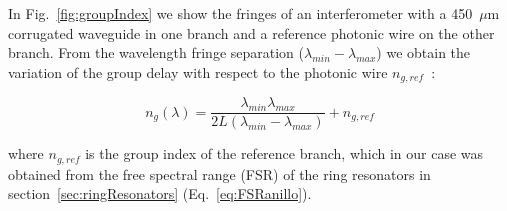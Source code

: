 \documentclass[journal]{IEEEtran}
\begin{document}




In Fig.~\ref{fig:groupIndex} we show the fringes of an interferometer with a 450~$\mu$m corrugated waveguide in one branch and a reference photonic wire on the other branch. From the wavelength fringe separation ($ \lambda_{min} - \lambda_{max} $) we obtain the variation of the group delay with respect to the photonic wire $ n_{g,ref} $~\cite{vlasov:05}:



\begin{equation}
  n_g (\lambda)=\frac{\lambda_{min} \lambda_{max}}{ 2L (\lambda_{min} - \lambda_{max})} + n_{g,ref}
\end{equation}


where $n_{g,ref}$ is the group index of the reference branch, which in our case was obtained from the free spectral range (FSR) of the ring resonators in section~\ref{sec:ringResonators} (Eq.~\ref{eq:FSRanillo}).  %



\end{document}
